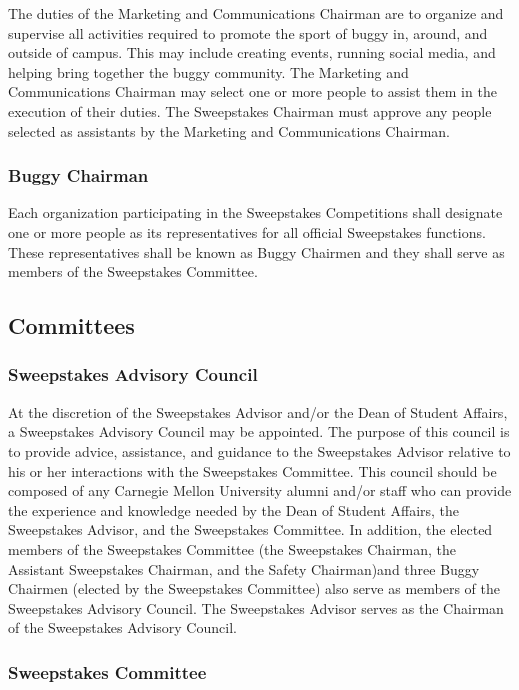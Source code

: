	The duties of the Marketing and Communications Chairman are to organize and supervise all activities required to promote the sport of buggy in, around, and outside of campus. This may include creating events, running social media, and helping bring together the buggy community. The Marketing and Communications Chairman may select one or more people to assist them in the execution of their duties. The Sweepstakes Chairman must approve any people selected as assistants by the Marketing and Communications Chairman. 

\subsubsection{Buggy Chairman}

	Each organization participating in the Sweepstakes Competitions shall designate one or more people as its representatives for all official Sweepstakes functions. These representatives shall be known as Buggy Chairmen and they shall serve as members of the Sweepstakes Committee.

\subsection{Committees}

\subsubsection{Sweepstakes Advisory Council}

	At the discretion of the Sweepstakes Advisor and/or the Dean of Student Affairs, a Sweepstakes Advisory Council may be appointed. The purpose of this council is to provide advice, assistance, and guidance to the Sweepstakes Advisor relative to his or her interactions with the Sweepstakes Committee. This council should be composed of any Carnegie Mellon University alumni and/or staff who can provide the experience and knowledge needed by the Dean of Student Affairs, the Sweepstakes Advisor, and the Sweepstakes Committee. In addition, the elected members of the Sweepstakes Committee (the Sweepstakes Chairman, the Assistant Sweepstakes Chairman, and the Safety Chairman)and three Buggy Chairmen (elected by the Sweepstakes Committee) also serve as members of the Sweepstakes Advisory Council. The Sweepstakes Advisor serves as the Chairman of the Sweepstakes Advisory Council.

\subsubsection{Sweepstakes Committee}

